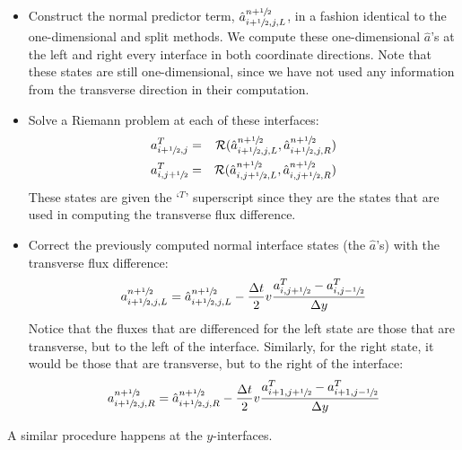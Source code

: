 \begin{itemize}
\item Construct the normal predictor term, $\hat{a}_{i+\sfrac{1}{2},j,L}^{n+\sfrac{1}{2}}$,
in a fashion identical to the one-dimensional and split methods.  We
compute these one-dimensional $\hat{a}$'s at the left and right every
interface in both coordinate directions.  Note that these states are
still one-dimensional, since we have not used any information from the
transverse direction in their computation.  

\item Solve a Riemann problem at each of these interfaces:
\begin{eqnarray}
a^T_{i+\sfrac{1}{2},j} &=& \mathcal{R}(\hat{a}_{i+\sfrac{1}{2},j,L}^{n+\sfrac{1}{2}},
                              \hat{a}_{i+\sfrac{1}{2},j,R}^{n+\sfrac{1}{2}}) \\
a^T_{i,j+\sfrac{1}{2}} &=& \mathcal{R}(\hat{a}_{i,j+\sfrac{1}{2},L}^{n+\sfrac{1}{2}},
                              \hat{a}_{i,j+\sfrac{1}{2},R}^{n+\sfrac{1}{2}}) \\
\end{eqnarray}
These states are given the `$^T$' superscript since they are the states
that are used in computing the transverse flux difference.  

\item Correct the 
previously computed normal interface states (the $\hat{a}$'s) with
the transverse flux difference:
\begin{equation}
a_{i+\sfrac{1}{2},j,L}^{n+\sfrac{1}{2}} = \hat{a}_{i+\sfrac{1}{2},j,L}^{n+\sfrac{1}{2}} 
   - \frac{\Delta t}{2} v \frac{a^T_{i,j+\sfrac{1}{2}} - a^T_{i,j-\sfrac{1}{2}}}{\Delta y}
\end{equation}
Notice that the
fluxes that are differenced for the left state are those that are
transverse, but to the left of the interface.  Similarly, for the
right state, it would be those that are transverse, but to the right
of the interface:
\begin{equation}
a_{i+\sfrac{1}{2},j,R}^{n+\sfrac{1}{2}} = \hat{a}_{i+\sfrac{1}{2},j,R}^{n+\sfrac{1}{2}} 
   - \frac{\Delta t}{2} v \frac{a^T_{i+1,j+\sfrac{1}{2}} - a^T_{i+1,j-\sfrac{1}{2}}}{\Delta y}
\end{equation}
\end{itemize}
A similar procedure happens at the $y$-interfaces.  

